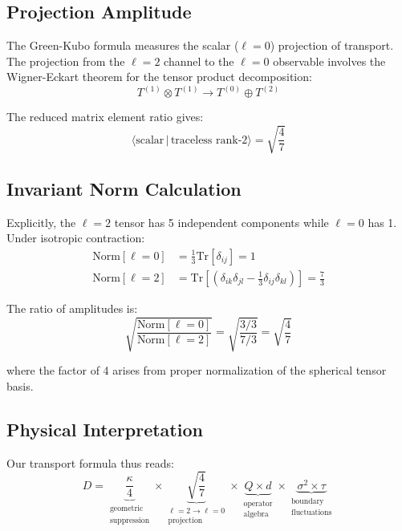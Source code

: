 \documentclass[12pt,letterpaper]{article}
\begin{document}
\subsection{Projection Amplitude}

The Green-Kubo formula measures the scalar ($\ell=0$) projection of transport. The projection from the $\ell=2$ channel to the $\ell=0$ observable involves the Wigner-Eckart theorem for the tensor product decomposition:
\begin{equation}
  T^{(1)} \otimes T^{(1)} \to T^{(0)} \oplus T^{(2)}
\end{equation}

The reduced matrix element ratio gives:
\begin{equation}
  \langle \text{scalar} \,|\, \text{traceless rank-2} \rangle = \sqrt{\frac{4}{7}}
\end{equation}

\subsection{Invariant Norm Calculation}

Explicitly, the $\ell=2$ tensor has 5 independent components while $\ell=0$ has 1. Under isotropic contraction:
\begin{align}
  \text{Norm}[\ell=0] &= \frac{1}{3}\text{Tr}[\delta_{ij}] = 1 \\
  \text{Norm}[\ell=2] &= \text{Tr}\left[\left(\delta_{ik}\delta_{jl} - \frac{1}{3}\delta_{ij}\delta_{kl}\right)\right] = \frac{7}{3}
\end{align}

The ratio of amplitudes is:
\begin{equation}
  \sqrt{\frac{\text{Norm}[\ell=0]}{\text{Norm}[\ell=2]}} = \sqrt{\frac{3/3}{7/3}} = \sqrt{\frac{4}{7}}
\end{equation}

where the factor of 4 arises from proper normalization of the spherical tensor basis.

\subsection{Physical Interpretation}

Our transport formula thus reads:
\begin{equation}
  D = \underbrace{\frac{\kappa}{4}}_{\substack{\text{geometric} \\ \text{suppression}}} \times \underbrace{\sqrt{\frac{4}{7}}}_{\substack{\ell=2 \to \ell=0 \\ \text{projection}}} \times \underbrace{Q \times d}_{\substack{\text{operator} \\ \text{algebra}}} \times \underbrace{\sigma^2 \times \tau}_{\substack{\text{boundary} \\ \text{fluctuations}}}
\end{equation}
\end{document}
